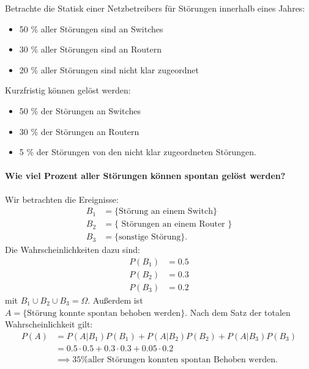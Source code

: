 \begin{example}
Betrachte die Statisk einer Netzbetreibers für Störungen innerhalb eines Jahres:
\begin{itemize}
    \item 50 \% aller Störungen sind an Switches 
    \item 30 \% aller Störungen sind an Routern 
    \item 20 \% aller Störungen sind nicht klar zugeordnet
\end{itemize}
Kurzfristig können gelöst werden:
\begin{itemize}
    \item 50 \% der Störungen an Switches 
    \item 30 \% der Störungen an Routern 
    \item 5 \% der Störungen von den nicht klar zugeordneten Störungen.
\end{itemize}
\paragraph{Wie viel Prozent aller Störungen können spontan gelöst werden?}
Wir betrachten die Ereignisse: 
\begin{align*}
    B_1 &= \{ \text{Störung an einem Switch}\} \\
    B_2 &= \{\text{ Störungen an einem Router }\} \\
    B_3 &= \{\text{sonstige Störung}\} 
.\end{align*}
Die Wahrscheinlichkeiten dazu sind:
\begin{align*}
    P(B_1)&= 0.5\\ P(B_2)&=0.3 \\ P(B_3)&=0.2
\end{align*} mit $B_1 \cup B_2 \cup B_3 = \Omega$. Außerdem ist $A = \{\text{Störung konnte spontan behoben werden}\} $. Nach dem Satz der totalen Wahrscheinlichkeit gilt:
\begin{align*}
    P(A) &= P(A|B_1)P(B_1)+P(A|B_2)P(B_2)+P(A|B_3)P(B_3)\\
         &= 0.5 \cdot 0.5 + 0.3 \cdot 0.3 + 0.05\cdot 0.2 \\
         &\implies 35 \text{\% aller Störungen konnten spontan Behoben werden}
.\end{align*}%
\end{example}

